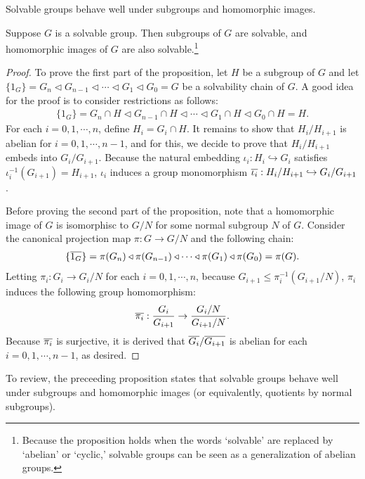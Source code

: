Solvable groups behave well under subgroups and homomorphic images.
\begin{prop}
    Suppose $G$ is a solvable group.
    Then subgroups of $G$ are solvable, and homomorphic images of $G$ are also solvable.\footnote{Because the proposition holds when the words `solvable' are replaced by `abelian' or `cyclic,' solvable groups can be seen as a generalization of abelian groups.}
\end{prop}
\begin{proof}
    To prove the first part of the proposition, let $H$ be a subgroup of $G$ and let $\{1_G\}=G_n\triangleleft G_{n-1}\triangleleft \cdots \triangleleft G_1 \triangleleft G_0=G$ be a solvability chain of $G$.
    A good idea for the proof is to consider restrictions as follows:
    \begin{align*}
        \{1_G\}=G_n\cap H\triangleleft G_{n-1}\cap H\triangleleft \cdots \triangleleft G_1\cap H \triangleleft G_0\cap H=H.
    \end{align*}
    For each $i=0, 1, \cdots, n$, define $H_i=G_i\cap H$.
    It remains to show that $H_i/H_{i+1}$ is abelian for $i=0, 1, \cdots, n-1$, and for this, we decide to prove that $H_i/H_{i+1}$ embeds into $G_i/G_{i+1}$.
    Because the natural embedding $\iota_i: H_i\hookrightarrow G_i$ satisfies $\iota_i^{-1}(G_{i+1})=H_{i+1}$, $\iota_i$ induces a group monomorphism $\overline{\iota_i}: H_i/H_{i+1}\hookrightarrow G_i/G_{i+1}$.

    Before proving the second part of the proposition, note that a homomorphic image of $G$ is isomorphisc to $G/N$ for some normal subgroup $N$ of $G$.
    Consider the canonical projection map $\pi: G\rightarrow G/N$ and the following chain:
    \begin{align*}
        \{\overline{1_G}\}=\pi(G_n)\triangleleft \pi(G_{n-1})\triangleleft \cdots \triangleleft \pi(G_1) \triangleleft \pi(G_0)=\pi(G).
    \end{align*}
    Letting $\pi_i: G_i\rightarrow G_i/N$ for each $i=0, 1, \cdots, n$, because $G_{i+1}\leq\pi_i^{-1}(G_{i+1}/N)$, $\pi_i$ induces the following group homomorphism:
    \begin{align*}
        \overline{\pi_i}: \frac{G_i}{G_{i+1}}\rightarrow\frac{G_i/N}{G_{i+1}/N}.
    \end{align*}
    Because $\overline{\pi_i}$ is surjective, it is derived that $\overline{G_i}/\overline{G_{i+1}}$ is abelian for each $i=0, 1, \cdots, n-1$, as desired.
\end{proof}
To review, the preceeding proposition states that solvable groups behave well under subgroups and homomorphic images (or equivalently, quotients by normal subgroups).
